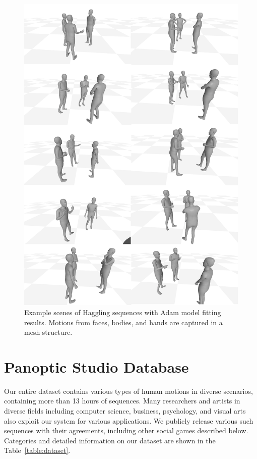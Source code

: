 \begin{figure}
	\centering
	\includegraphics[width=\textwidth]{ssp_fig/haggling_adam}
	\caption{Example scenes of Haggling sequences with Adam model fitting results. Motions from faces, bodies, and hands are captured in a mesh structure.} 
	\label{fig:haggling_measurement_adam}
\end{figure}



\section{Panoptic Studio Database}
Our entire dataset contains various types of human motions in diverse scenarios, containing more than 13 hours of sequences. Many researchers and artists in diverse fields including computer science, business, psychology, and visual arts also exploit our system for various applications. We publicly release various such sequences with their agreements, including other social games described below. Categories and detailed information on our dataset are shown in the Table~\ref{table:dataset}.

